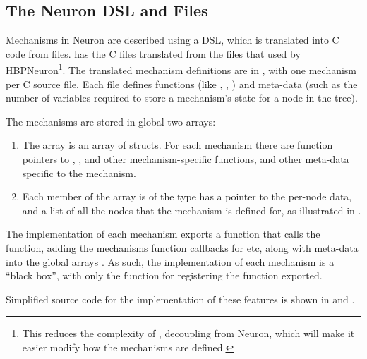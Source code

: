\subsection{The Neuron DSL and \hoc Files}
Mechanisms in Neuron are described using a DSL, which is translated into C code from \hoc files.
\neuron has the C files translated from the \hoc files that used by HBPNeuron\footnote{This reduces the complexity of \neuron, decoupling \neuron from Neuron, which will make it easier modify how the mechanisms are defined.}.
The translated mechanism definitions are in , with one mechanism per C source file.
Each file defines functions (like , , ) and meta-data (such as the number of variables required to store a mechanism's state for a node in the tree).

\begin{infobox}{The mechanisms are stored in global two arrays:}
\begin{enumerate}[leftmargin=*]
\item
    The array  is an array of  structs. For each mechanism there are function pointers to , ,  and other mechanism-specific functions, and other meta-data specific to the mechanism.
\item
    Each member of the array  is of the type  has a pointer to the per-node data, and a list of all the nodes that the mechanism is defined for, as illustrated in .
\end{enumerate}
\end{infobox}

The implementation of each mechanism exports a function  that calls the  function, adding the mechanisms function callbacks for  etc, along with meta-data into the global arrays .
As such, the implementation of each mechanism is a ``black box'', with only the function for registering the function exported.

Simplified source code for the implementation of these features is shown in  and .

\label{sec:cellgroupccode}

